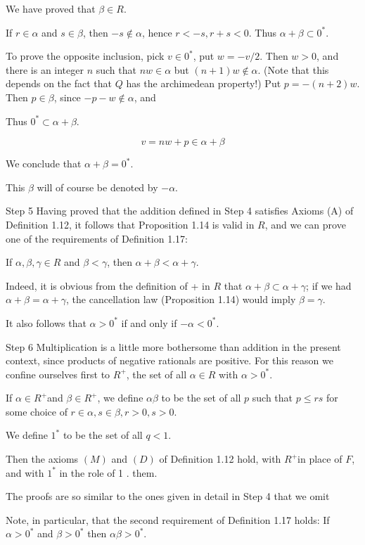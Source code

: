 \documentclass[10pt]{article}
\begin{document}
We have proved that $\beta \in R$.

If $r \in \alpha$ and $s \in \beta$, then $-s \notin \alpha$, hence $r<-s, r+s<0$. Thus $\alpha+\beta \subset 0^{*}$.

To prove the opposite inclusion, pick $v \in 0^{*}$, put $w=-v / 2$. Then $w>0$, and there is an integer $n$ such that $n w \in \alpha$ but $(n+1) w \notin \alpha$. (Note that this depends on the fact that $Q$ has the archimedean property!) Put $p=-(n+2) w$. Then $p \in \beta$, since $-p-w \notin \alpha$, and

Thus $0^{*} \subset \alpha+\beta$.

$$
v=n w+p \in \alpha+\beta
$$

We conclude that $\alpha+\beta=0^{*}$.

This $\beta$ will of course be denoted by $-\alpha$.

Step 5 Having proved that the addition defined in Step 4 satisfies Axioms (A) of Definition 1.12, it follows that Proposition 1.14 is valid in $R$, and we can prove one of the requirements of Definition 1.17:

If $\alpha, \beta, \gamma \in R$ and $\beta<\gamma$, then $\alpha+\beta<\alpha+\gamma$.

Indeed, it is obvious from the definition of + in $R$ that $\alpha+\beta \subset \alpha+\gamma$; if we had $\alpha+\beta=\alpha+\gamma$, the cancellation law (Proposition 1.14) would imply $\beta=\gamma$.

It also follows that $\alpha>0^{*}$ if and only if $-\alpha<0^{*}$.

Step 6 Multiplication is a little more bothersome than addition in the present context, since products of negative rationals are positive. For this reason we confine ourselves first to $R^{+}$, the set of all $\alpha \in R$ with $\alpha>0^{*}$.

If $\alpha \in R^{+}$and $\beta \in R^{+}$, we define $\alpha \beta$ to be the set of all $p$ such that $p \leq r s$ for some choice of $r \in \alpha, s \in \beta, r>0, s>0$.

We define $1^{*}$ to be the set of all $q<1$.

Then the axioms $(M)$ and $(D)$ of Definition 1.12 hold, with $R^{+}$in place of $F$, and with $1^{*}$ in the role of 1 . them.

The proofs are so similar to the ones given in detail in Step 4 that we omit

Note, in particular, that the second requirement of Definition 1.17 holds: If $\alpha>0^{*}$ and $\beta>0^{*}$ then $\alpha \beta>0^{*}$.
\end{document}
